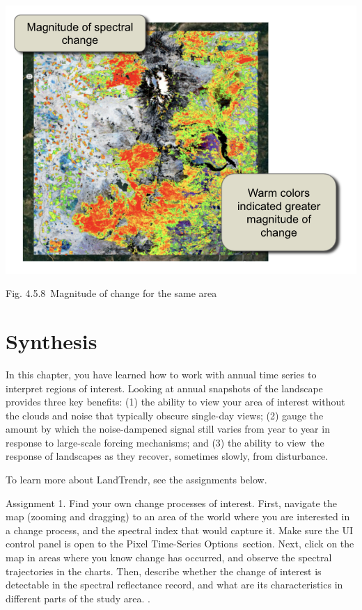 \documentclass[
  letterpaper,
  DIV=11,
  numbers=noendperiod]{scrreprt}
\begin{document}
\includegraphics{./F4/image14.png}

Fig. 4.5.8~Magnitude of change for the same area

\hypertarget{synthesis-8}{%
\section*{Synthesis}\label{synthesis-8}}


In this chapter, you have learned how to work with annual time series to
interpret regions of interest. Looking at annual snapshots of the
landscape provides three key benefits: (1) the ability to view your area
of interest without the clouds and noise that typically obscure
single-day views; (2) gauge the amount by which the noise-dampened
signal still varies from year to year in response to large-scale forcing
mechanisms; and (3) the ability to view~the response of landscapes as
they recover, sometimes slowly, from disturbance.

To learn more about LandTrendr, see the assignments below.

Assignment 1. Find your own change processes of interest. First,
navigate the map (zooming and dragging) to an area of the world where
you are interested in a change process, and the spectral index that
would capture it. Make sure the UI control panel is open to the Pixel
Time-Series Options~section. Next, click on the map in areas where you
know change has occurred, and observe the spectral trajectories in the
charts. Then, describe whether the change of interest is detectable in
the spectral reflectance record, and what are its characteristics in
different parts of the study area. .
\end{document}
